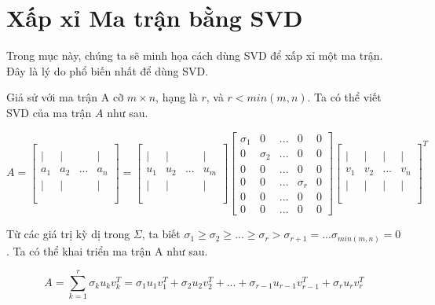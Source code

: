 \section{Xấp xỉ Ma trận bằng SVD}

Trong mục này, chúng ta sẽ minh họa cách dùng SVD để xấp xỉ một ma trận. Đây là lý do phổ biến nhất để dùng SVD.

Giả sử với ma trận A cỡ $m \times n$, hạng là $r$, và $r<min(m,n)$. Ta có thể viết SVD của ma trận $A$ như sau.

\[
A=\begin{bmatrix}
 &  &  &  \\
| & | &  & |\\
a_{1} & a_{2} & ... & a_{n} \\
| & | &  & |\\
 &  &  & \\
 &  &  &
\end{bmatrix}=\begin{bmatrix}
 &  &  &  \\
| & | &  & |\\
u_{1} & u_{2} & ... & u_{m} \\
| & | &  & |\\
 &  &  & \\
 &  &  &
\end{bmatrix}\begin{bmatrix}
\sigma_{1} & 0 & ... & 0 &0 \\
0 & \sigma_{2} & ... & 0 &0\\
0 & 0 & ... & 0 &0\\
0 & 0 & ... & \sigma_{r} &0\\
0 & 0 & ... & 0 &0\\
0 & 0 & ... & 0 &0
\end{bmatrix}\begin{bmatrix}
 &  &  &  \\
| & | & | & | \\
v_{1} & v_{2} & ... & v_{n} \\
| & | & | & | \\
 &  &  & \\
 &  &  &
\end{bmatrix}^{T}
\]

Từ các giá trị kỳ dị trong $\Sigma$, ta biết $\sigma_{1}\ge \sigma_{2}\ge ...\ge \sigma_{r}>\sigma_{r+1}=...\sigma_{min(m,n)}=0$. Ta có thể khai triển ma trận A như sau.

\[
A=\sum_{k=1}^{r}\sigma_{k}u_{k}v_{k}^{T}=\sigma_{1}u_{1}v_{1}^{T}+\sigma_{2}u_{2}v_{2}^{T}+...+\sigma_{r-1}u_{r-1}v_{r-1}^{T}+\sigma_{r}u_{r}v_{r}^{T}
\]

